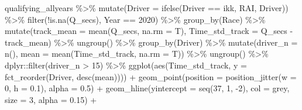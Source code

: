 \documentclass[
]{book}
\newenvironment{Shaded}{\begin{snugshade}}{\end{snugshade}}
\newcommand{\AttributeTok}[1]{\textcolor[rgb]{0.77,0.63,0.00}{#1}}
\newcommand{\DecValTok}[1]{\textcolor[rgb]{0.00,0.00,0.81}{#1}}
\newcommand{\FloatTok}[1]{\textcolor[rgb]{0.00,0.00,0.81}{#1}}
\newcommand{\FunctionTok}[1]{\textcolor[rgb]{0.00,0.00,0.00}{#1}}
\newcommand{\NormalTok}[1]{#1}
\newcommand{\SpecialCharTok}[1]{\textcolor[rgb]{0.00,0.00,0.00}{#1}}
\newcommand{\StringTok}[1]{\textcolor[rgb]{0.31,0.60,0.02}{#1}}
\begin{document}
\begin{Shaded}
\begin{Highlighting}[]
\NormalTok{qualifying\_allyears }\SpecialCharTok{\%\textgreater{}\%}
  \FunctionTok{mutate}\NormalTok{(}\AttributeTok{Driver =} \FunctionTok{ifelse}\NormalTok{(Driver }\SpecialCharTok{==} \StringTok{\textquotesingle{}ikk\textquotesingle{}}\NormalTok{, }\StringTok{\textquotesingle{}RAI\textquotesingle{}}\NormalTok{, Driver)) }\SpecialCharTok{\%\textgreater{}\%} 
  \FunctionTok{filter}\NormalTok{(}\SpecialCharTok{!}\FunctionTok{is.na}\NormalTok{(Q\_secs),}
\NormalTok{         Year }\SpecialCharTok{==} \DecValTok{2020}\NormalTok{) }\SpecialCharTok{\%\textgreater{}\%}
  \FunctionTok{group\_by}\NormalTok{(Race) }\SpecialCharTok{\%\textgreater{}\%}
  \FunctionTok{mutate}\NormalTok{(}\AttributeTok{track\_mean =} \FunctionTok{mean}\NormalTok{(Q\_secs, }\AttributeTok{na.rm =}\NormalTok{ T),}
         \AttributeTok{Time\_std\_track =}\NormalTok{ Q\_secs }\SpecialCharTok{{-}}\NormalTok{ track\_mean) }\SpecialCharTok{\%\textgreater{}\%} 
  \FunctionTok{ungroup}\NormalTok{() }\SpecialCharTok{\%\textgreater{}\%} 
  \FunctionTok{group\_by}\NormalTok{(Driver) }\SpecialCharTok{\%\textgreater{}\%} 
  \FunctionTok{mutate}\NormalTok{(}\AttributeTok{driver\_n =} \FunctionTok{n}\NormalTok{(),}
         \AttributeTok{mean =} \FunctionTok{mean}\NormalTok{(Time\_std\_track, }\AttributeTok{na.rm =}\NormalTok{ T)) }\SpecialCharTok{\%\textgreater{}\%}
  \FunctionTok{ungroup}\NormalTok{() }\SpecialCharTok{\%\textgreater{}\%}
\NormalTok{  dplyr}\SpecialCharTok{::}\FunctionTok{filter}\NormalTok{(driver\_n }\SpecialCharTok{\textgreater{}} \DecValTok{15}\NormalTok{) }\SpecialCharTok{\%\textgreater{}\%} 
  \FunctionTok{ggplot}\NormalTok{(}\FunctionTok{aes}\NormalTok{(Time\_std\_track, }\AttributeTok{y =} \FunctionTok{fct\_reorder}\NormalTok{(Driver, }\FunctionTok{desc}\NormalTok{(mean)))) }\SpecialCharTok{+}
  \FunctionTok{geom\_point}\NormalTok{(}\AttributeTok{position =} \FunctionTok{position\_jitter}\NormalTok{(}\AttributeTok{w =} \DecValTok{0}\NormalTok{, }\AttributeTok{h =} \FloatTok{0.1}\NormalTok{), }\AttributeTok{alpha =} \FloatTok{0.5}\NormalTok{) }\SpecialCharTok{+}
  \FunctionTok{geom\_hline}\NormalTok{(}\AttributeTok{yintercept =} \FunctionTok{seq}\NormalTok{(}\DecValTok{37}\NormalTok{, }\DecValTok{1}\NormalTok{, }\SpecialCharTok{{-}}\DecValTok{2}\NormalTok{), }\AttributeTok{col =} \StringTok{\textquotesingle{}grey\textquotesingle{}}\NormalTok{, }\AttributeTok{size =} \DecValTok{3}\NormalTok{, }\AttributeTok{alpha =} \FloatTok{0.15}\NormalTok{) }\SpecialCharTok{+}

\end{Highlighting}
\end{Shaded}
\end{document}
